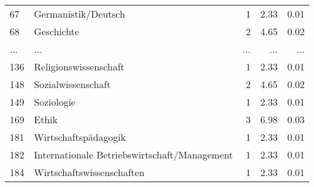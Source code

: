 \begin{longtable}{lXrrr}
        67 & \multicolumn{1}{X}{Germanistik/Deutsch} & %
          \num{1} &
          \num[round-mode=places,round-precision=2]{2,33} &
          \num[round-mode=places,round-precision=2]{0,01} \\
        68 & \multicolumn{1}{X}{Geschichte} & %
          \num{2} &
          \num[round-mode=places,round-precision=2]{4,65} &
          \num[round-mode=places,round-precision=2]{0,02} \\
       ... & ... & ... & ... & ... \\
        136 & \multicolumn{1}{X}{Religionswissenschaft} & %
          \num{1} &
          \num[round-mode=places,round-precision=2]{2,33} &
          \num[round-mode=places,round-precision=2]{0,01} \\

        148 & \multicolumn{1}{X}{Sozialwissenschaft} & %
          \num{2} &
          \num[round-mode=places,round-precision=2]{4,65} &
          \num[round-mode=places,round-precision=2]{0,02} \\

        149 & \multicolumn{1}{X}{Soziologie} & %
          \num{1} &
          \num[round-mode=places,round-precision=2]{2,33} &
          \num[round-mode=places,round-precision=2]{0,01} \\

        169 & \multicolumn{1}{X}{Ethik} & %
          \num{3} &
          \num[round-mode=places,round-precision=2]{6,98} &
          \num[round-mode=places,round-precision=2]{0,03} \\

        181 & \multicolumn{1}{X}{Wirtschaftspädagogik} & %
          \num{1} &
          \num[round-mode=places,round-precision=2]{2,33} &
          \num[round-mode=places,round-precision=2]{0,01} \\

        182 & \multicolumn{1}{X}{Internationale Betriebswirtschaft/Management} & %
          \num{1} &
          \num[round-mode=places,round-precision=2]{2,33} &
          \num[round-mode=places,round-precision=2]{0,01} \\

        184 & \multicolumn{1}{X}{Wirtschaftswissenschaften} & %
          \num{1} &
          \num[round-mode=places,round-precision=2]{2,33} &
          \num[round-mode=places,round-precision=2]{0,01} \\


\end{longtable}
